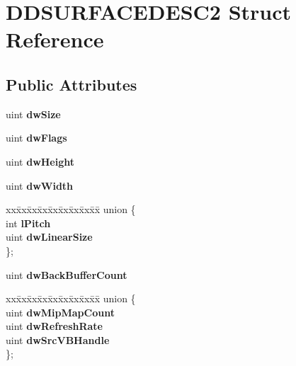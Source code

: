 \hypertarget{struct_d_d_s_u_r_f_a_c_e_d_e_s_c2}{}\section{D\+D\+S\+U\+R\+F\+A\+C\+E\+D\+E\+S\+C2 Struct Reference}
\label{struct_d_d_s_u_r_f_a_c_e_d_e_s_c2}
\subsection*{Public Attributes}
\begin{DoxyCompactItemize}
\item 
\mbox{\label{struct_d_d_s_u_r_f_a_c_e_d_e_s_c2_aa86f74b7f3b67f51928470b717663eed}} 
uint {\bfseries dw\+Size}
\item 
\mbox{\label{struct_d_d_s_u_r_f_a_c_e_d_e_s_c2_a01003dd668221026a147075177e57607}} 
uint {\bfseries dw\+Flags}
\item 
\mbox{\label{struct_d_d_s_u_r_f_a_c_e_d_e_s_c2_a2fa974c393dceaef70025b65b69da0c4}} 
uint {\bfseries dw\+Height}
\item 
\mbox{\label{struct_d_d_s_u_r_f_a_c_e_d_e_s_c2_a83b7976f8c3c5710d2bb005c2e64f688}} 
uint {\bfseries dw\+Width}
\item 
\mbox{\label{struct_d_d_s_u_r_f_a_c_e_d_e_s_c2_a3d18871195d51e6f54bc54890d711146}} 
\begin{tabbing}
xx\=xx\=xx\=xx\=xx\=xx\=xx\=xx\=xx\=\kill
union \{\\
\>int {\bfseries lPitch}\\
\>uint {\bfseries dwLinearSize}\\
\}; \\

\end{tabbing}\item 
\mbox{\label{struct_d_d_s_u_r_f_a_c_e_d_e_s_c2_a9e79c97510cac5ef0353f24de1821312}} 
uint {\bfseries dw\+Back\+Buffer\+Count}
\item 
\mbox{\label{struct_d_d_s_u_r_f_a_c_e_d_e_s_c2_a6164de9a3e358483c26397e02a500c06}} 
\begin{tabbing}
xx\=xx\=xx\=xx\=xx\=xx\=xx\=xx\=xx\=\kill
union \{\\
\>uint {\bfseries dwMipMapCount}\\
\>uint {\bfseries dwRefreshRate}\\
\>uint {\bfseries dwSrcVBHandle}\\
\}; \\


\end{tabbing}
\end{DoxyCompactItemize}
